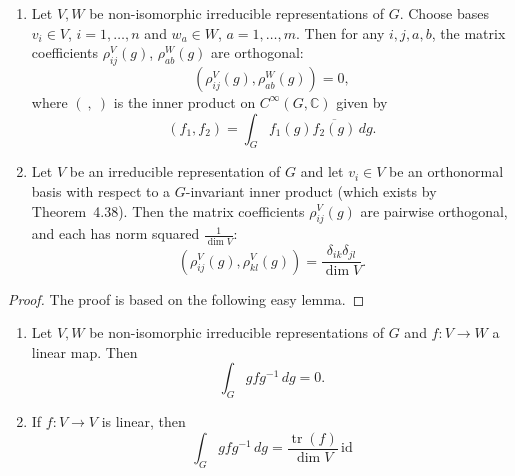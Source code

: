 \documentclass[12pt]{article}
\begin{document}
\begin{theorem}\leavevmode
    \begin{enumerate}
        \item Let $V,W$ be non-isomorphic irreducible representations of $G$.
              Choose bases $v_i\in V$, $i=1,\dots,n$ and $w_a\in W$, $a=1,\dots,m$.
              Then for any $i,j,a,b$, the matrix coefficients
              $\rho^V_{ij}(g)$, $\rho^W_{ab}(g)$ are orthogonal:
              \[
                  (\rho^V_{ij}(g),\rho^W_{ab}(g))=0,
              \]
              where $(\ ,\ )$ is the inner product on $C^\infty(G,\mathbb C)$ given by
              \begin{equation}\label{4.1}
                  (f_1,f_2)=\int_G f_1(g)\overline{f_2(g)}\,dg.
              \end{equation}

        \item Let $V$ be an irreducible representation of $G$ and let $v_i\in V$
              be an orthonormal basis with respect to a $G$-invariant inner product
              (which exists by Theorem~4.38). Then the matrix coefficients
              $\rho^V_{ij}(g)$ are pairwise orthogonal, and each has norm squared
              $\frac{1}{\dim V}$:
              \begin{equation}\label{4.2}
                  (\rho^V_{ij}(g),\rho^V_{kl}(g))
                  =\frac{\delta_{ik}\delta_{jl}}{\dim V}.
              \end{equation}
    \end{enumerate}
\end{theorem}

\begin{proof}
    The proof is based on the following easy lemma.
\end{proof}

\begin{lemma}
    \leavevmode
    \begin{enumerate}
        \item Let $V,W$ be non-isomorphic irreducible representations of $G$
              and $f:V\to W$ a linear map. Then
              \[
                  \int_G g f g^{-1}\,dg=0.
              \]

        \item If $f:V\to V$ is linear, then
              \[
                  \int_G g f g^{-1}\,dg=\frac{\operatorname{tr}(f)}{\dim V}\,\mathrm{id}
              \]
    \end{enumerate}
\end{lemma}
\end{document}
